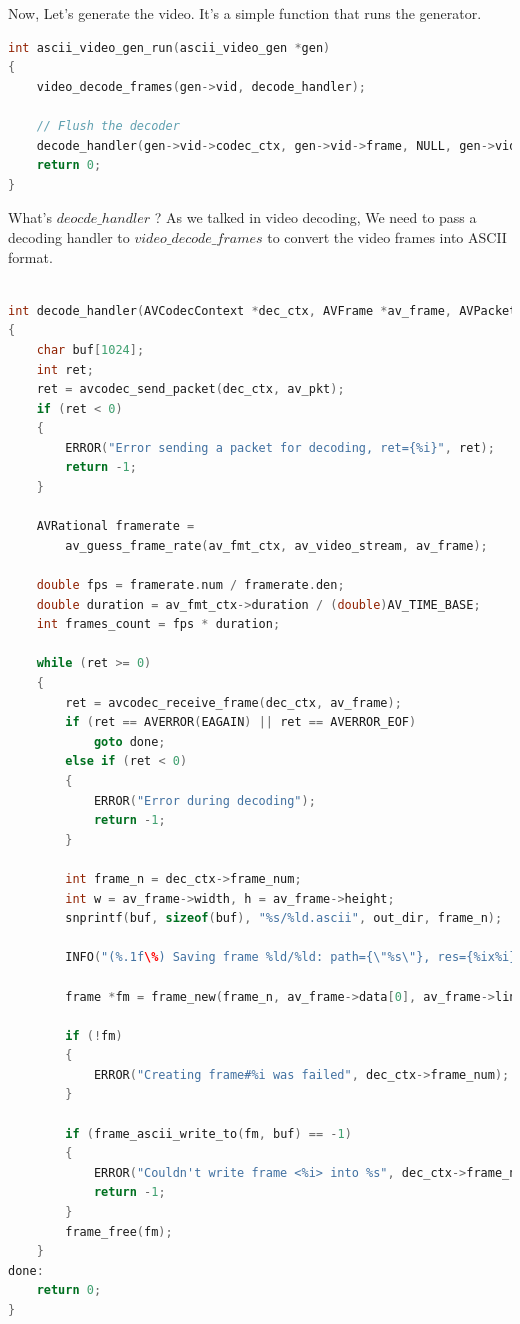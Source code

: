 \documentclass[a4paper,12pt]{article}
\begin{document}
Now, Let's generate the video. It's a simple function that runs the generator. 
\begin{lstlisting}[language=c]
int ascii_video_gen_run(ascii_video_gen *gen)
{
    video_decode_frames(gen->vid, decode_handler);

    // Flush the decoder
    decode_handler(gen->vid->codec_ctx, gen->vid->frame, NULL, gen->vid->fmt_ctx, gen->vid->video_stream, gen->dest);
    return 0;
}
\end{lstlisting}
\newpage
What's $deocde\_handler$ ? As we talked in video decoding, We need to pass a decoding handler to $video\_decode\_frames$ to convert the video frames into ASCII format. 

\begin{lstlisting}[language=c]

int decode_handler(AVCodecContext *dec_ctx, AVFrame *av_frame, AVPacket *av_pkt, AVFormatContext *av_fmt_ctx, AVStream *av_video_stream, const char *out_dir)
{
    char buf[1024];
    int ret;
    ret = avcodec_send_packet(dec_ctx, av_pkt);
    if (ret < 0)
    {
        ERROR("Error sending a packet for decoding, ret={%i}", ret);
        return -1;
    }

    AVRational framerate =
        av_guess_frame_rate(av_fmt_ctx, av_video_stream, av_frame);

    double fps = framerate.num / framerate.den;
    double duration = av_fmt_ctx->duration / (double)AV_TIME_BASE;
    int frames_count = fps * duration;

    while (ret >= 0)
    {
        ret = avcodec_receive_frame(dec_ctx, av_frame);
        if (ret == AVERROR(EAGAIN) || ret == AVERROR_EOF)
            goto done;
        else if (ret < 0)
        {
            ERROR("Error during decoding");
            return -1;
        }

        int frame_n = dec_ctx->frame_num;
        int w = av_frame->width, h = av_frame->height;
        snprintf(buf, sizeof(buf), "%s/%ld.ascii", out_dir, frame_n);

        INFO("(%.1f\%) Saving frame %ld/%ld: path={\"%s\"}, res={%ix%i}", frame_n / (float)frames_count * 100, frame_n, frames_count, buf, av_frame->width, av_frame->height);

        frame *fm = frame_new(frame_n, av_frame->data[0], av_frame->linesize[0], w, h);

        if (!fm)
        {
            ERROR("Creating frame#%i was failed", dec_ctx->frame_num);
        }

        if (frame_ascii_write_to(fm, buf) == -1)
        {
            ERROR("Couldn't write frame <%i> into %s", dec_ctx->frame_num, buf);
            return -1;
        }
        frame_free(fm);
    }
done:
    return 0;
}    
\end{lstlisting}
\end{document}

